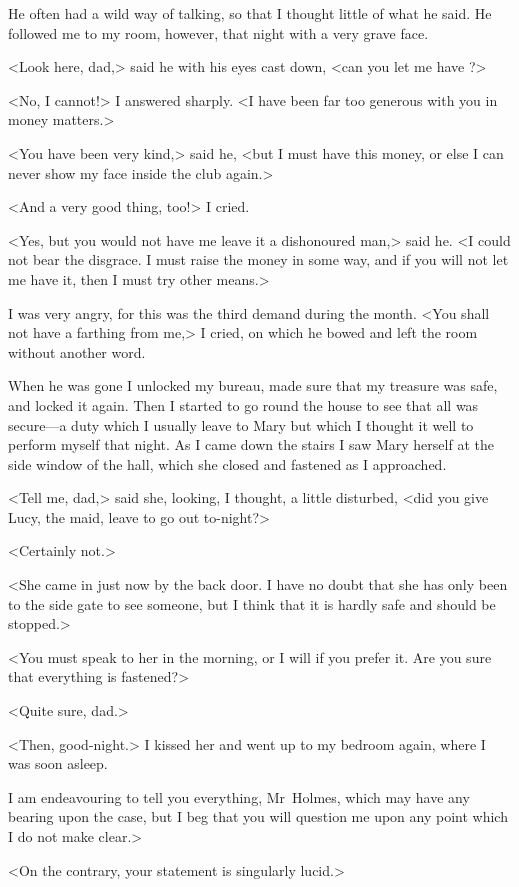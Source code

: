 He often had a wild way of talking, so that I thought little of what he said. He followed me to my room, however, that night with a very grave face.

<Look here, dad,> said he with his eyes cast down, <can you let me have ?>

<No, I cannot!> I answered sharply. <I have been far too generous with you in money matters.>

<You have been very kind,> said he, <but I must have this money, or else I can never show my face inside the club again.>

<And a very good thing, too!> I cried.

<Yes, but you would not have me leave it a dishonoured man,> said he. <I could not bear the disgrace. I must raise the money in some way, and if you will not let me have it, then I must try other means.>

I was very angry, for this was the third demand during the month. <You shall not have a farthing from me,> I cried, on which he bowed and left the room without another word.

When he was gone I unlocked my bureau, made sure that my treasure was safe, and locked it again. Then I started to go round the house to see that all was secure—a duty which I usually leave to Mary but which I thought it well to perform myself that night. As I came down the stairs I saw Mary herself at the side window of the hall, which she closed and fastened as I approached.

<Tell me, dad,> said she, looking, I thought, a little disturbed, <did you give Lucy, the maid, leave to go out to-night?>

<Certainly not.>

<She came in just now by the back door. I have no doubt that she has only been to the side gate to see someone, but I think that it is hardly safe and should be stopped.>

<You must speak to her in the morning, or I will if you prefer it. Are you sure that everything is fastened?>

<Quite sure, dad.>

<Then, good-night.> I kissed her and went up to my bedroom again, where I was soon asleep.

I am endeavouring to tell you everything, Mr~Holmes, which may have any bearing upon the case, but I beg that you will question me upon any point which I do not make clear.>

<On the contrary, your statement is singularly lucid.>

